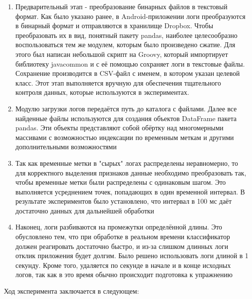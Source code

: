 \begin{enumerate}
\setcounter{enumi}{0}
\item Предварительный этап - преобразование бинарных файлов в текстовый формат. Как было указано ранее, в Android-приложении логи преобразуются в бинарный формат и отправляются в хранилище Dropbox. Чтобы преобразовать их в вид, понятный пакету pandas, наиболее целесообразно воспользоваться тем же модулем, которым было произведено сжатие. Для этого был написан небольшой скрипт на Groovy, который импортирует библиотеку javacommon и с её помощью сохраняет логи в текстовые файлы. Сохранение производится в CSV-файл с именем, в котором указан целевой класс. Этот этап выполняется вручную для обеспечения тщательного контроля данных, которые используются в экспериментах.
\item Модулю загрузки логов передаётся путь до каталога с файлами. Далее все найденные файлы используются для создания объектов DataFrame пакета pandas. Эти объекты представляют собой обёртку над многомерными массивами с возможностью индексации по временным меткам и другими дополнительными возможностями
\item Так как временные метки в "сырых" логах распределены неравномерно, то для корректного выделения признаков данные необходимо преобразовать так, чтобы временные метки были распределены с одинаковым шагом. Это выполняется усреднением точек, попадающих в один временной интервал. В результате экспериментов было установлено, что интервал в 100 мс даёт достаточно данных для дальнейшей обработки
\item Наконец, логи разбиваются на промежутки определённой длины. Это обусловлено тем, что при обработке в реальном времени классификатор должен реагировать достаточно быстро, и из-за слишком длинных логи отклик приложения будет долгим. Было решено использовать логи длиной в 1 секунду. Кроме того, удаляется по секунде в начале и в конце исходных логов, так как в это время обычно происходит подготовка к упражнению
\end{enumerate}

Ход эксперимента заключается в следующем:

